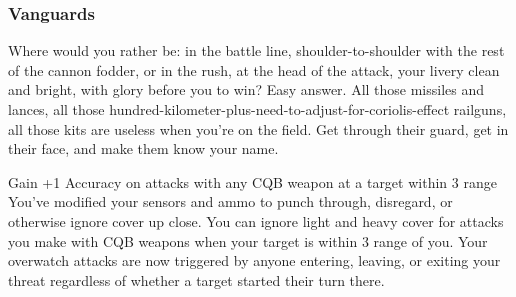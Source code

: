 \subsubsection{Vanguards}

\begin{talent}
{Where would you rather be: in the battle line, shoulder-to-shoulder with the rest of the cannon fodder, or in the rush, at the head of the attack, your livery clean and bright, with glory before you to win? Easy answer. All those missiles and lances, all those hundred-kilometer-plus-need-to-adjust-for-coriolis-effect railguns, all those kits are useless when you're on the field. Get through their guard, get in their face, and make them know your name.}

Gain +1 Accuracy on attacks with any CQB weapon at a target within 3 range 
You've modified your sensors and ammo to punch through, disregard, or otherwise ignore cover up close. You can ignore light and heavy cover for attacks you make with CQB weapons when your target is within 3 range of you. 
Your overwatch attacks are now triggered by anyone entering, leaving, or exiting your threat regardless of whether a target started their turn there.
\end{talent}